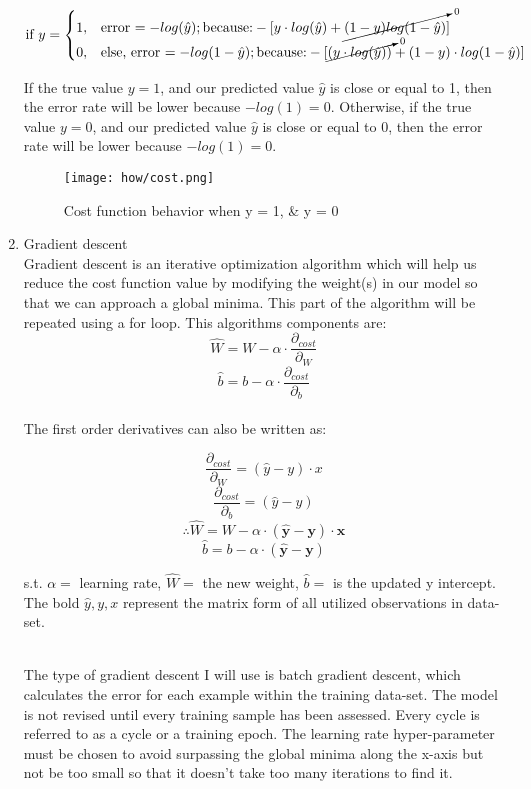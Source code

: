 \documentclass[notitlepage,a4paper,oneside,article,table]{article}
\begin{document}
\begin{enumerate}
    \begin{equation}
  \text{if } y = \begin{cases}
    1, & \text{error $= -log(\hat{y})$}; \text{because:} -[y \cdot log(\hat{y}) + \cancelto{0}{(1 - y)log(1-\hat{y})} ]\\

    0, & \text{else, error $= -log(1 - \hat{y})$}; \text{because:} -[\cancelto{0}{(y \cdot log(\hat{y}))} + (1 - y) \cdot log(1-\hat{y})]
  \end{cases}
\end{equation}

If the true value $y = 1$, and our predicted value $\hat{y}$ is close or equal to 1, then the error rate will be lower because $-log(1)=0$. 
Otherwise, if the true value $y = 0$, and our predicted value $\hat{y}$ is close or equal to 0, then the error rate will be lower because $-log(1)=0$.




\begin{figure}[h] %
    \centering
    \texttt{[image: how/cost.png]}
    \caption{Cost function behavior when y = 1, \& y = 0}
\end{figure}
\FloatBarrier

    
    \item Gradient descent\\
    Gradient descent is an iterative optimization algorithm which will help us reduce the cost function value by modifying the weight(s) in our model so that we can approach a global minima. This part of the algorithm will be repeated using a for loop. This algorithms components are:
    $$\hat{W} = W - \alpha \cdot \frac{\partial_{cost}}{\partial_{W}}$$
    $$\hat{b} = b - \alpha \cdot \frac{\partial_{cost}}{\partial_{b}}$$
    \\
    The first order derivatives can also be written as: 
	
    $$\frac{\partial_{cost}}{\partial_{W}} = (\hat{y} - y) \cdot x$$
    $$\frac{\partial_{cost}}{\partial_{b}} = (\hat{y} - y)$$
    $$\therefore \hat{W} = W - \alpha \cdot \boldsymbol{(\hat{y} - y) \cdot x}$$
    $$\hat{b} = b - \alpha \cdot \boldsymbol{(\hat{y} - y)}$$
    \begin{center}
    s.t. $\alpha = $ learning rate, $\hat{W} = $ the new weight, $\hat{b} = $ is the updated y intercept. The bold $\hat{y}, y, x$ represent the matrix form of all utilized observations in data-set.
    \end{center}
    \\
    The type of gradient descent I will use is batch gradient descent, which calculates the error for each example within the training data-set. The model is not revised until every training sample has been assessed. Every cycle is referred to as a cycle or a training epoch. The learning rate hyper-parameter must be chosen to avoid surpassing the global minima along the x-axis but not be too small so that it doesn't take too many iterations to find it.


\end{enumerate}
\end{document}
